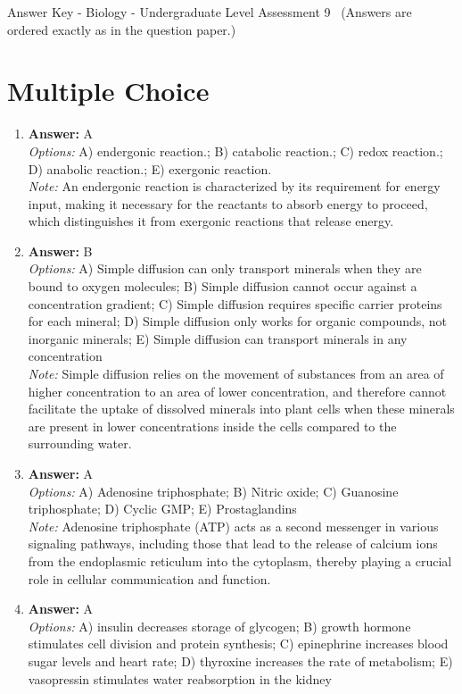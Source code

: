 \documentclass[12pt]{article}
\begin{document}
\begin{center}
Answer Key - Biology - Undergraduate Level Assessment 9 \
\small (Answers are ordered exactly as in the question paper.)
\end{center}

\section*{Multiple Choice}
\begin{enumerate}[label=\arabic*.]
\item \textbf{Answer:} A
\\ \textit{Options:} A) endergonic reaction.; B) catabolic reaction.; C) redox reaction.; D) anabolic reaction.; E) exergonic reaction.
\\ \textit{Note:} An endergonic reaction is characterized by its requirement for energy input, making it necessary for the reactants to absorb energy to proceed, which distinguishes it from exergonic reactions that release energy.
\item \textbf{Answer:} B
\\ \textit{Options:} A) Simple diffusion can only transport minerals when they are bound to oxygen molecules; B) Simple diffusion cannot occur against a concentration gradient; C) Simple diffusion requires specific carrier proteins for each mineral; D) Simple diffusion only works for organic compounds, not inorganic minerals; E) Simple diffusion can transport minerals in any concentration
\\ \textit{Note:} Simple diffusion relies on the movement of substances from an area of higher concentration to an area of lower concentration, and therefore cannot facilitate the uptake of dissolved minerals into plant cells when these minerals are present in lower concentrations inside the cells compared to the surrounding water.
\item \textbf{Answer:} A
\\ \textit{Options:} A) Adenosine triphosphate; B) Nitric oxide; C) Guanosine triphosphate; D) Cyclic GMP; E) Prostaglandins
\\ \textit{Note:} Adenosine triphosphate (ATP) acts as a second messenger in various signaling pathways, including those that lead to the release of calcium ions from the endoplasmic reticulum into the cytoplasm, thereby playing a crucial role in cellular communication and function.
\item \textbf{Answer:} A
\\ \textit{Options:} A) insulin decreases storage of glycogen; B) growth hormone stimulates cell division and protein synthesis; C) epinephrine increases blood sugar levels and heart rate; D) thyroxine increases the rate of metabolism; E) vasopressin stimulates water reabsorption in the kidney

\end{enumerate}
\end{document}
